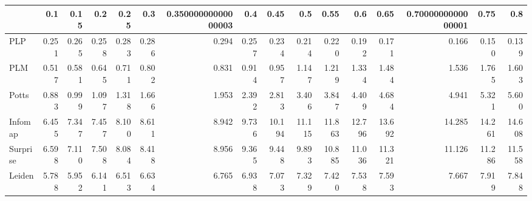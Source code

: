 \begin{tabular}{lrrrrrrrrrrrrrrr}
\toprule
{} &   0.1 &  0.15 &   0.2 &  0.25 &   0.3 & 0.35000000000000003 &   0.4 &   0.45 &    0.5 &   0.55 &    0.6 &   0.65 & 0.7000000000000001 &   0.75 &    0.8 \\
\midrule
PLP      & 0.251 & 0.265 & 0.258 & 0.283 & 0.286 &               0.294 & 0.257 &  0.234 &  0.214 &  0.220 &  0.192 &  0.171 &              0.166 &  0.150 &  0.139 \\
PLM      & 0.517 & 0.581 & 0.645 & 0.711 & 0.802 &               0.831 & 0.914 &  0.957 &  1.147 &  1.219 &  1.334 &  1.484 &              1.536 &  1.765 &  1.603 \\
Potts    & 0.883 & 0.999 & 1.097 & 1.318 & 1.666 &               1.953 & 2.392 &  2.813 &  3.406 &  3.847 &  4.409 &  4.684 &              4.941 &  5.321 &  5.600 \\
Infomap  & 6.455 & 7.347 & 7.457 & 8.100 & 8.611 &               8.942 & 9.736 & 10.194 & 11.115 & 11.863 & 12.796 & 13.692 &             14.285 & 14.261 & 14.608 \\
Surprise & 6.598 & 7.110 & 7.508 & 8.084 & 8.418 &               8.956 & 9.365 &  9.448 &  9.893 & 10.885 & 11.036 & 11.321 &             11.126 & 11.286 & 11.558 \\
Leiden   & 5.788 & 5.952 & 6.141 & 6.513 & 6.634 &               6.765 & 6.938 &  7.073 &  7.329 &  7.420 &  7.538 &  7.593 &              7.667 &  7.919 &  7.848 \\
\bottomrule
\end{tabular}
